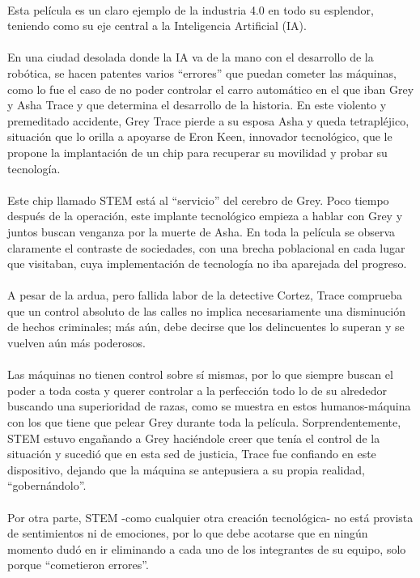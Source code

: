\documentclass[letterpaper,12pt]{article} %
\begin{document}
    \\
	Esta película es un claro ejemplo de la industria 4.0 en todo su esplendor, teniendo como su eje central a la Inteligencia Artificial (IA). \\ \\
	En una ciudad desolada donde la IA va de la mano con el desarrollo de la robótica, se hacen patentes varios “errores” que puedan cometer las máquinas, como lo fue el caso de no poder controlar el carro automático en el que iban Grey y Asha Trace y que determina el desarrollo de la historia. En este violento y premeditado accidente, Grey Trace pierde a su esposa Asha y queda tetrapléjico, situación que lo orilla a apoyarse de Eron Keen, innovador tecnológico, que le propone la implantación de un chip para recuperar su movilidad y probar su tecnología. \\ \\
	Este chip llamado STEM está al “servicio” del cerebro de Grey. Poco tiempo después de la operación, este implante tecnológico empieza a hablar con Grey y juntos buscan venganza por la muerte de Asha. En toda la película se observa claramente el contraste de sociedades, con una brecha poblacional en cada lugar que visitaban, cuya implementación de tecnología no iba aparejada del progreso. \\ \\
	A pesar de la ardua, pero fallida labor de la detective Cortez, Trace comprueba que un control absoluto de las calles no implica necesariamente una disminución de hechos criminales; más aún, debe decirse que los delincuentes lo superan y se vuelven aún más poderosos. \\ \\
	Las máquinas no tienen control sobre sí mismas, por lo que siempre buscan el poder a toda costa y querer controlar a la perfección todo lo de su alrededor buscando una superioridad de razas, como se muestra en estos humanos-máquina con los que tiene que pelear Grey durante toda la película. Sorprendentemente, STEM estuvo engañando a Grey haciéndole creer que tenía el control de la situación y sucedió que en esta sed de justicia, Trace fue confiando en este dispositivo, dejando que la máquina se antepusiera a su propia realidad, “gobernándolo”. \\ \\
	Por otra parte, STEM -como cualquier otra creación tecnológica- no está provista de sentimientos ni de emociones, por lo que debe acotarse que en ningún momento dudó en ir eliminando a cada uno de los integrantes de su equipo, solo porque “cometieron errores”.
\end{document}
